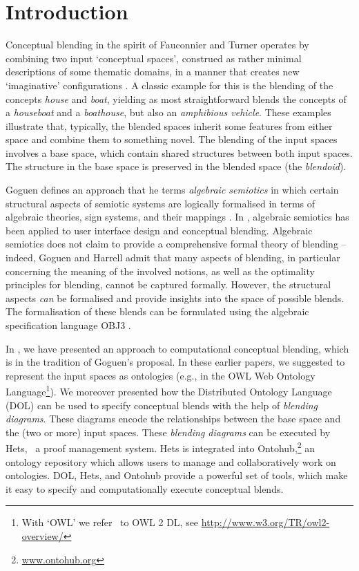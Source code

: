 \documentclass[letterpaper]{article}
\newcommand{\OWL}{\textmd{\textsc{OWL}}\xspace}
\begin{document}
\section{Introduction}

Conceptual blending in the spirit of Fauconnier and Turner operates by
combining two input `conceptual spaces', construed as rather minimal
descriptions of some thematic domains, in a manner that creates new
`imaginative' configurations \citep{FauconnierTurner2003,Turner2014}. A classic example for this is the
blending of the concepts \emph{house} and \emph{boat}, yielding as
most straightforward blends the concepts of a \emph{houseboat} and a
\emph{boathouse}, but also an \emph{amphibious vehicle}. These examples
 illustrate that, typically, the blended spaces inherit some features from
  either space and combine them to something novel. The blending of the input 
spaces involves a base space, which contain shared structures between both input spaces. 
The structure in the base space is preserved in the blended space (the \emph{blendoid}). 

Goguen defines an approach that he terms \emph{algebraic semiotics} in 
 which certain structural aspects of semiotic systems are logically
  formalised in terms of algebraic theories, sign systems, and their mappings \citep{Goguen99}. 
%
In \cite{goguenharrell10}, algebraic
semiotics has been applied to user interface design and conceptual blending.
 Algebraic semiotics does not claim to provide a comprehensive formal theory of blending 
 -- indeed, Goguen and Harrell admit that many  aspects of blending, in particular concerning
  the meaning of the involved notions, as well as the optimality principles for blending, 
  cannot be captured formally.  However, the structural
aspects \emph{can} be formalised and provide insights into the space of possible blends. 
The formalisation of these blends can be formulated  using the algebraic specification language OBJ3 \citep{GoguenMalcolm96}. 


In \cite{HoisEtAl2010,blendingc3gi12,iccc14-ontohub}, we have presented an approach to computational conceptual blending,  which is in the tradition of Goguen's proposal. In these earlier papers, we suggested to represent the input  spaces as ontologies (e.g., in the OWL Web Ontology Language\footnote{With `\OWL' we refer \ to \OWL 2 DL, see \url{http://www.w3.org/TR/owl2-overview/}}). We moreover presented how  the Distributed Ontology Language (DOL) can be used to specify conceptual blends with the help
  of \emph{blending diagrams}. These diagrams encode the relationships between the base space 
  and the (two or more) input spaces. These \emph{blending diagrams} can be executed by Hets,
  \ a proof management system. Hets is integrated into Ontohub,\footnote{\url{www.ontohub.org}} 
  an ontology repository which allows users to manage and collaboratively work on ontologies.  DOL, Hets, and Ontohub provide a powerful set of tools,    which make it easy to specify and computationally execute conceptual blends. 
\end{document}
